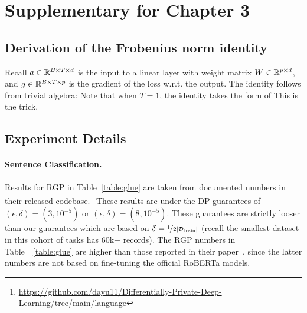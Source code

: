 \appendix
\section{Supplementary for Chapter 3}

\subsection{Derivation of the Frobenius norm identity} \label{app:frobenius}
Recall $a \in \mathbb{R}^{B\times T \times d}$ is the input to a linear layer with weight matrix $W \in \mathbb{R}^{p \times d}$, and $g \in \mathbb{R}^{B \times T \times p}$ is the gradient of the loss w.r.t. the output. The identity follows from trivial algebra:
Note that when $T=1$, the identity takes the form of 
This is the \cite{goodfellow2015efficient} trick.

\newpage
\subsection{Experiment Details}\label{app:experiments_main}

\paragraph{Sentence Classification.}
Results for RGP in Table~\ref{table:glue} are taken from documented numbers in their released codebase.\footnote{\url{https://github.com/dayu11/Differentially-Private-Deep-Learning/tree/main/language}}
These results are under the DP guarantees of $(\epsilon, \delta)=(3, 10^{-5})$ or $(\epsilon, \delta)=(8, 10^{-5})$.
These guarantees are strictly looser than our guarantees which are based on $\delta=\nicefrac{1}{2 |\mathcal{D}_\text{train}|}$ (recall the smallest dataset in this cohort of tasks has $60$k+ records).
The RGP numbers in Table~~\ref{table:glue} are higher than those reported in their paper~\citep{yu2021large}, since the latter numbers are not based on fine-tuning the official RoBERTa models.

